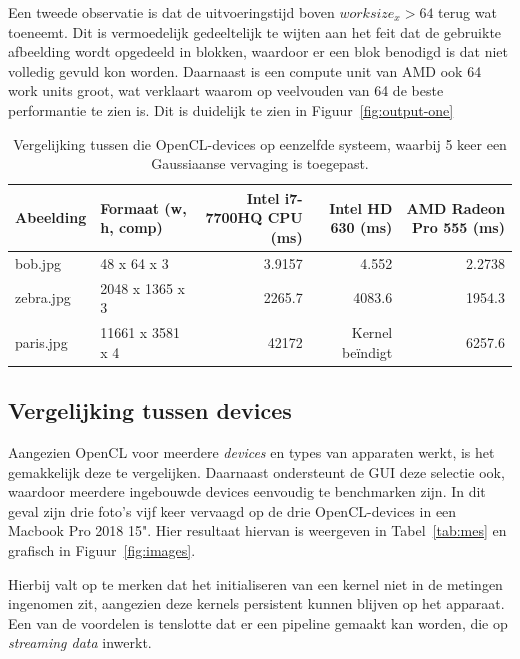 \documentclass[twocolumn, a4paper]{article}
\begin{document}
Een tweede observatie is dat de uitvoeringstijd boven $work size_x > 64$ terug wat toeneemt. Dit is vermoedelijk gedeeltelijk te wijten aan het feit dat de gebruikte afbeelding wordt opgedeeld in blokken, waardoor er een blok benodigd is dat niet volledig gevuld kon worden. Daarnaast is een compute unit van AMD ook 64 work units groot, wat verklaart waarom op veelvouden van 64 de beste performantie te zien is. Dit is duidelijk te zien in Figuur~\ref{fig:output-one}

\begin{table}[]
    \centering
    \caption{Vergelijking tussen die OpenCL-devices op eenzelfde systeem, waarbij 5 keer een Gaussiaanse vervaging is toegepast.}\label{tab:mes}
    \label{table:measurements}
    \begin{tabular}{@{}llrrr@{}}
        \toprule
        Abeelding & Formaat (w, h, comp) & Intel i7-7700HQ CPU {(}ms{)} & Intel HD 630 {(}ms{)} & AMD Radeon Pro 555 {(}ms{)} \\ \midrule
        bob.jpg   & 48 x 64 x 3              & 3.9157                       & 4.552                 & 2.2738                      \\
        zebra.jpg & 2048 x 1365 x 3      & 2265.7                       & 4083.6                & 1954.3                      \\
        paris.jpg & 11661 x 3581 x 4 & 42172 &Kernel beïndigt& 6257.6 \\ \bottomrule
    \end{tabular}
\end{table}

\subsection{Vergelijking tussen devices}
Aangezien OpenCL voor meerdere \emph{devices} en types van apparaten werkt, is het gemakkelijk deze te vergelijken. Daarnaast ondersteunt de GUI deze selectie ook, waardoor meerdere ingebouwde devices eenvoudig te benchmarken zijn. In dit geval zijn drie foto's vijf keer vervaagd op de drie OpenCL-devices in een Macbook Pro 2018 15". Hier resultaat hiervan is weergeven in Tabel~\ref{tab:mes} en grafisch in Figuur~\ref{fig:images}.

Hierbij valt op te merken dat het initialiseren van een kernel niet in de metingen ingenomen zit, aangezien deze kernels persistent kunnen blijven op het apparaat. Een van de voordelen is tenslotte dat er een pipeline gemaakt kan worden, die op \emph{streaming data} inwerkt. 
\end{document}
